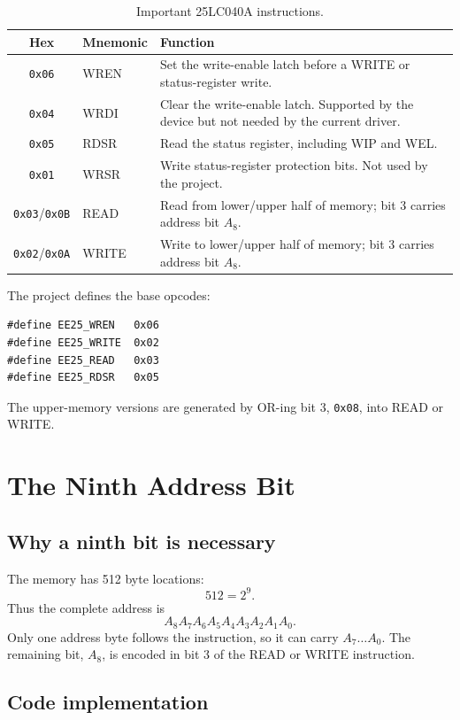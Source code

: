\documentclass[11pt,a4paper]{article}
\begin{document}
\begin{table}[H]
\centering
\caption{Important 25LC040A instructions.}
\begin{tabular}{clp{}}
\toprule
Hex & Mnemonic & Function \\
\midrule
\texttt{0x06} & WREN & Set the write-enable latch before a WRITE or status-register write. \\
\texttt{0x04} & WRDI & Clear the write-enable latch. Supported by the device but not needed by the current driver. \\
\texttt{0x05} & RDSR & Read the status register, including WIP and WEL. \\
\texttt{0x01} & WRSR & Write status-register protection bits. Not used by the project. \\
\texttt{0x03}/\texttt{0x0B} & READ & Read from lower/upper half of memory; bit 3 carries address bit $A_8$. \\
\texttt{0x02}/\texttt{0x0A} & WRITE & Write to lower/upper half of memory; bit 3 carries address bit $A_8$. \\
\bottomrule
\end{tabular}
\end{table}

The project defines the base opcodes:
\begin{lstlisting}[style=cstyle]
#define EE25_WREN   0x06
#define EE25_WRITE  0x02
#define EE25_READ   0x03
#define EE25_RDSR   0x05
\end{lstlisting}
The upper-memory versions are generated by OR-ing bit 3, \texttt{0x08}, into READ or WRITE.

\section{The Ninth Address Bit}

\subsection{Why a ninth bit is necessary}
The memory has 512 byte locations:
\[
512=2^9.
\]
Thus the complete address is
\[
A_8A_7A_6A_5A_4A_3A_2A_1A_0.
\]
Only one address byte follows the instruction, so it can carry $A_7\ldots A_0$. The remaining bit, $A_8$, is encoded in bit 3 of the READ or WRITE instruction.

\subsection{Code implementation}
\end{document}
